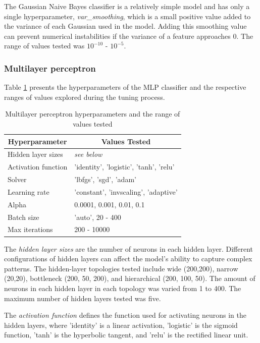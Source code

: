 The Gaussian Naive Bayes classifier is a relatively simple model and has only a single hyperparameter, \textit{var\_smoothing}, which is a small positive value added to the variance of each Gaussian used in the model. Adding this smoothing value can prevent numerical instabilities if the variance of a feature approaches 0. The range of values tested was $10^{-10}$ - $10^{-5}$.

\subsubsection{Multilayer perceptron}

Table \ref{tab:mlp_params} presents the hyperparameters of the MLP classifier and the respective ranges of values explored during the tuning process.

\begin{table}[h]
	\centering
	\begin{tabular}{ll}
		\toprule
		\multicolumn{1}{c}{\textbf{Hyperparameter}} & \multicolumn{1}{c}{\textbf{Values Tested}} \\
		\midrule
		Hidden layer sizes  				& \textit{see below} \\
		Activation function 				& 'identity', 'logistic', 'tanh', 'relu' \\
		Solver 								& 'lbfgs', 'sgd', 'adam' \\
		Learning rate 						& 'constant', 'invscaling', 'adaptive' \\
		Alpha 								& 0.0001, 0.001, 0.01, 0.1 \\
		Batch size 							& 'auto', 20 - 400 \\
		Max iterations					    & 200 - 10000 \\
		\bottomrule
	\end{tabular}
	\caption{Multilayer perceptron hyperparameters and the range of values tested}
	\label{tab:mlp_params}
\end{table}

The \textit{hidden layer sizes} are the number of neurons in each hidden layer. Different configurations of hidden layers can affect the model's ability to capture complex patterns. The hidden-layer topologies tested include wide (200,200), narrow (20,20), bottleneck (200, 50, 200), and hierarchical (200, 100, 50). The amount of neurons in each hidden layer in each topology was varied from 1 to 400. The maximum number of hidden layers tested was five.

The \textit{activation function} defines the function used for activating neurons in the hidden layers, where 'identity' is a linear activation, 'logistic' is the sigmoid function, 'tanh' is the hyperbolic tangent, and 'relu' is the rectified linear unit.

